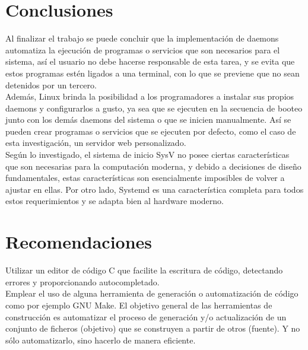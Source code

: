 \documentclass[conference]{IEEEtran}
\begin{document}

\section{Conclusiones}

Al finalizar el trabajo se puede concluir que la implementación de daemons automatiza la ejecución de programas o servicios que son necesarios para el sistema, así el usuario no debe hacerse responsable de esta tarea, y se evita que estos programas estén ligados a una terminal, con lo que se previene que no sean detenidos por un tercero.
\\Además, Linux brinda la posibilidad a los programadores a instalar sus propios daemons y configurarlos a gusto, ya sea que se ejecuten en la secuencia de booteo junto con los demás daemons del sistema o que se inicien manualmente. Así se pueden crear programas o servicios que se ejecuten por defecto, como el caso de esta investigación, un servidor web personalizado.
\\Según lo investigado, el sistema de inicio SysV no posee ciertas características que son necesarias para la computación moderna, y debido a decisiones de diseño fundamentales, estas características son esencialmente imposibles de volver a ajustar en ellas. Por otro lado, Systemd es una característica completa para todos estos requerimientos y se adapta bien al hardware moderno.



\section{Recomendaciones}
Utilizar un editor de código C que facilite la escritura de código, detectando errores y proporcionando autocompletado.
\\Emplear el uso de alguna herramienta de generación o automatización de código como por ejemplo GNU Make. El objetivo general de las herramientas de construcción es automatizar el proceso de generación y/o actualización de un conjunto de ficheros (objetivo) que se construyen a partir de otros (fuente). Y no sólo automatizarlo, sino hacerlo de manera eficiente.

\end{document}
